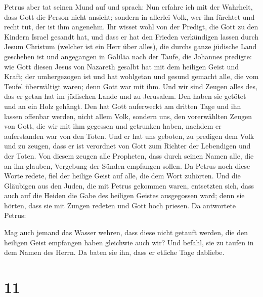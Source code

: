  Petrus aber tat seinen Mund auf und sprach: Nun erfahre
ich mit der Wahrheit, dass Gott die Person nicht ansieht;
 sondern in allerlei Volk, wer ihn fürchtet und recht
tut, der ist ihm angenehm.  Ihr wisset wohl von der
Predigt, die Gott zu den Kindern Israel gesandt hat, und dass er hat den
Frieden verkündigen lassen durch Jesum Christum (welcher ist ein Herr
über alles),  die durchs ganze jüdische Land geschehen
ist und angegangen in Galiläa nach der Taufe, die Johannes predigte:
 wie Gott diesen Jesus von Nazareth gesalbt hat mit dem
heiligen Geist und Kraft; der umhergezogen ist und hat wohlgetan und
gesund gemacht alle, die vom Teufel überwältigt waren; denn Gott war mit
ihm.  Und wir sind Zeugen alles des, das er getan hat im
jüdischen Lande und zu Jerusalem. Den haben sie getötet und an ein Holz
gehängt.  Den hat Gott auferweckt am dritten Tage und ihn
lassen offenbar werden,  nicht allem Volk, sondern uns,
den vorerwählten Zeugen von Gott, die wir mit ihm gegessen und getrunken
haben, nachdem er auferstanden war von den Toten.  Und er
hat uns geboten, zu predigen dem Volk und zu zeugen, dass er ist
verordnet von Gott zum Richter der Lebendigen und der Toten.
 Von diesem zeugen alle Propheten, dass durch seinen
Namen alle, die an ihn glauben, Vergebung der Sünden empfangen sollen.
 Da Petrus noch diese Worte redete, fiel der heilige
Geist auf alle, die dem Wort zuhörten.  Und die Gläubigen
aus den Juden, die mit Petrus gekommen waren, entsetzten sich, dass auch
auf die Heiden die Gabe des heiligen Geistes ausgegossen ward;
 denn sie hörten, dass sie mit Zungen redeten und Gott
hoch priesen. Da antwortete Petrus:

 Mag auch jemand das Wasser wehren, dass diese nicht
getauft werden, die den heiligen Geist empfangen haben gleichwie auch
wir?  Und befahl, sie zu taufen in dem Namen des Herrn.
Da baten sie ihn, dass er etliche Tage dabliebe.

\hypertarget{section-10}{%
\section{11}\label{section-10}}

